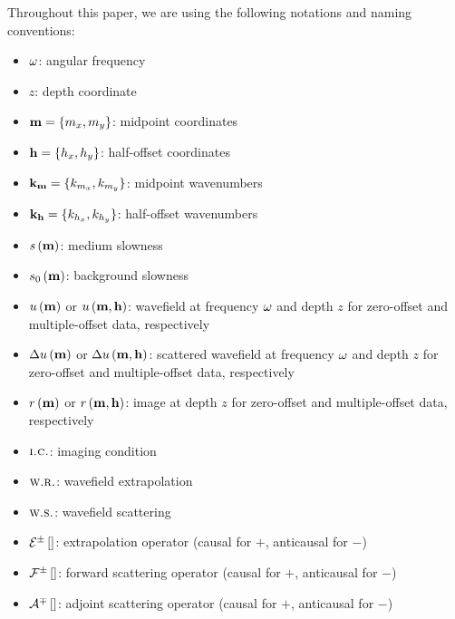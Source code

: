 Throughout this paper, we are using the following notations and naming
conventions:
\begin{singlespace}
\begin{itemize}
\item $\omega$: angular frequency
\item $z$: depth coordinate
\item ${\bf m}=\{m_x,m_y\}$: midpoint coordinates
\item ${\bf h}=\{h_x,h_y\}$: half-offset coordinates
\item ${{\bf k}_{\bf m}}=\{{k_{m_x}},{k_{m_y}}\}$: midpoint wavenumbers
\item ${{\bf k}_{\bf h}}=\{{k_{h_x}},{k_{h_y}}\}$: half-offset wavenumbers
\item $s\left ( {\bf m} \right)$:   medium slowness
\item $s_0\left ( {\bf m} \right)$: background slowness
\item ${u}\left ( {\bf m} \right)$ or ${u}\left ( {\bf m},{\bf h}\right)$: wavefield at frequency $\omega$ and depth $z$
for zero-offset and multiple-offset data, respectively
\item ${\Delta {u}}\left ( {\bf m} \right)$ or ${\Delta {u}}\left ( {\bf m},{\bf h}\right)$: scattered wavefield at frequency $\omega$ and depth $z$
for zero-offset and multiple-offset data, respectively
\item ${r}\left ( {\bf m} \right)$ or ${r}\left ( {\bf m},{\bf h}\right)$: image at depth $z$
for zero-offset and multiple-offset data, respectively
\item ${\textbf{\sc i.c.}}$: imaging condition
\item ${\textbf{\sc w.r.}}$: wavefield extrapolation
\item ${\textbf{\sc w.s.}}$: wavefield scattering
\item $\mathcal{E}^{\pm}_{}\left [  \right]$: extrapolation operator (causal for $+$, anticausal for $-$)
\item $\mathcal{F}^{\pm}_{}\left [  \right]$: forward scattering operator (causal for $+$, anticausal for $-$)
\item $\mathcal{A}^{\mp}_{}\left [  \right]$: adjoint scattering operator (causal for $+$, anticausal for $-$)
\end{itemize}
\end{singlespace}

